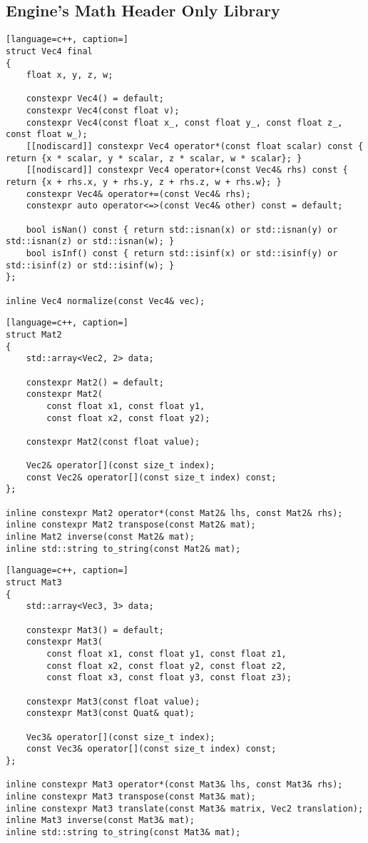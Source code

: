 \newpage

\subsection{Engine's Math Header Only Library}

\begin{lstlisting}[language=c++, caption=]
struct Vec4 final
{
    float x, y, z, w;

    constexpr Vec4() = default;
    constexpr Vec4(const float v);
    constexpr Vec4(const float x_, const float y_, const float z_, const float w_);
    [[nodiscard]] constexpr Vec4 operator*(const float scalar) const { return {x * scalar, y * scalar, z * scalar, w * scalar}; }
    [[nodiscard]] constexpr Vec4 operator+(const Vec4& rhs) const { return {x + rhs.x, y + rhs.y, z + rhs.z, w + rhs.w}; }
    constexpr Vec4& operator+=(const Vec4& rhs);
    constexpr auto operator<=>(const Vec4& other) const = default;

    bool isNan() const { return std::isnan(x) or std::isnan(y) or std::isnan(z) or std::isnan(w); }
    bool isInf() const { return std::isinf(x) or std::isinf(y) or std::isinf(z) or std::isinf(w); }
};

inline Vec4 normalize(const Vec4& vec);
\end{lstlisting}

\begin{lstlisting}[language=c++, caption=]
struct Mat2
{
    std::array<Vec2, 2> data;

    constexpr Mat2() = default;
    constexpr Mat2(
        const float x1, const float y1,
        const float x2, const float y2);

    constexpr Mat2(const float value);

    Vec2& operator[](const size_t index);
    const Vec2& operator[](const size_t index) const;
};

inline constexpr Mat2 operator*(const Mat2& lhs, const Mat2& rhs);
inline constexpr Mat2 transpose(const Mat2& mat);
inline Mat2 inverse(const Mat2& mat);
inline std::string to_string(const Mat2& mat);
\end{lstlisting}

\begin{lstlisting}[language=c++, caption=]
struct Mat3
{
    std::array<Vec3, 3> data;

    constexpr Mat3() = default;
    constexpr Mat3(
        const float x1, const float y1, const float z1,
        const float x2, const float y2, const float z2,
        const float x3, const float y3, const float z3);

    constexpr Mat3(const float value);
    constexpr Mat3(const Quat& quat);

    Vec3& operator[](const size_t index);
    const Vec3& operator[](const size_t index) const;
};

inline constexpr Mat3 operator*(const Mat3& lhs, const Mat3& rhs);
inline constexpr Mat3 transpose(const Mat3& mat);
inline constexpr Mat3 translate(const Mat3& matrix, Vec2 translation);
inline Mat3 inverse(const Mat3& mat);
inline std::string to_string(const Mat3& mat);
\end{lstlisting}

